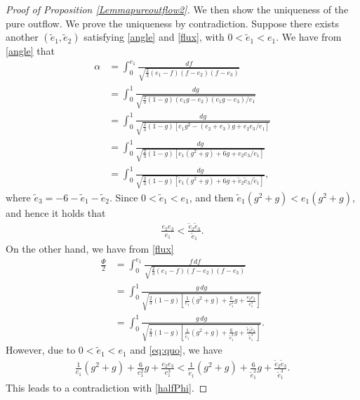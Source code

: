 \documentclass[reqno,12pt]{amsart}
\begin{document}
\begin{proof} [Proof of Proposition \ref{Lemmapureoutflow2}]
 We then show the uniqueness of the pure outflow. 
 We prove the uniqueness by contradiction. Suppose there exists another $(\tilde{e}_1, \tilde{e}_2)$ satisfying \eqref{angle} and \eqref{flux}, with 
$0< \tilde{e}_1 < e_1$. We have from \eqref{angle} that
\begin{align}\nonumber
\alpha & = \int_0^{e_1} \frac{df}{\sqrt{\frac23 (e_1 - f) (f- e_2) (f - e_3)}} \\ \nonumber
&= \int_0^1 \frac{dg}{\sqrt{\frac23 (1-g) (e_1 g - e_2) ( e_1 g - e_3) / e_1 }}\\ \nonumber
&= \int_0^1 \frac{dg}{\sqrt{\frac23 (1- g) \left[  e_1 g^2 - (e_2 + e_3) g + e_2 e_3 / e_1\right]}}\\ \nonumber
&= \int_0^1 \frac{dg}{\sqrt{\frac23 (1- g) \left[ e_1 (g^2 + g) + 6 g + e_2 e_3 / e_1 \right]}} \\ \nonumber
& = \int_0^1 \frac{dg}{\sqrt{\frac23 (1- g) \left[\tilde{e}_1 (g^2 + g) + 6 g + \tilde{e}_2 \tilde{e}_3 / \tilde{e}_1 \right]}},
\end{align}
where $\tilde{e}_3=-6-\tilde{e}_1-\tilde{e}_2$.
Since $0<\tilde{e}_1 < e_1$, and then $\tilde{e}_1 (g^2 + g) < e_1 (g^2 + g)$, and hence it holds that 
\begin{align}\label{eq:quo}
\frac{e_2e_3}{e_1} < \frac{\tilde{e}_2 \tilde{e}_3}{\tilde{e}_1}. 
\end{align}
On the other hand, we have from \eqref{flux}
\begin{equation}\label{halfPhi}
\begin{aligned} 
\frac{\Phi}{2}&  = \int_0^{e_1} \frac{f\, df}{\sqrt{\frac23 (e_1 -f ) (f-e_2) (f-e_3)}}\\ 
&= \int_0^1 \frac{g \, dg}{\sqrt{\frac23 (1- g) \left[ \frac{1}{e_1}(g^2 + g) + \frac{6}{e_1^2} g + \frac{e_2e_3}{e_1^3}\right]}}\\ 
& = \int_0^1 \frac{g \, dg}{\sqrt{\frac23 (1- g) \left[ \frac{1}{\tilde{e}_1}(g^2 + g) + \frac{6}{\tilde{e}_1^2} g + \frac{\tilde{e}_2 \tilde{e}_3}{\tilde{e}_1^3}\right]}}.
\end{aligned}
\end{equation}
However, due to  $0<\tilde{e}_1 < e_1$ and \eqref{eq:quo}, we have
\begin{align}\nonumber
\frac{1}{e_1} (g^2 + g) + \frac{6}{e_1^2} g + \frac{e_2 e_3}{e_1^3}
< \frac{1}{\tilde{e}_1 }(g^2 + g) + \frac{6}{\tilde{e}_1^2} g + \frac{\tilde{e}_2 \tilde{e}_3}{\tilde{e}_1^3}. 
\end{align}
This leads to a contradiction with \eqref{halfPhi}.


\end{proof}
\end{document}
